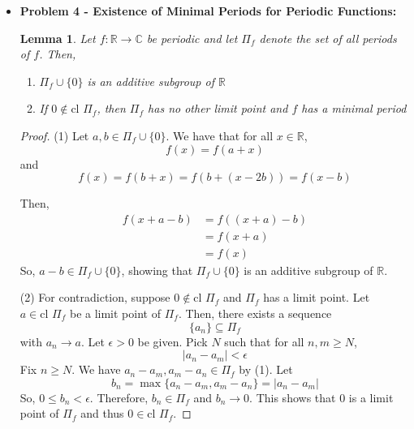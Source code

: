 \documentclass[12pt, reqno]{amsart}
\newtheorem{lemma}[theorem]{Lemma}
\theoremstyle{definition}
\theoremstyle{remark}
\begin{document}
\begin{itemize}
\begin{itemize}
\begin{proof}
We have \begin{align*}
I_{n}&\ge \frac{2}{\pi^{2}}\log n\\
I_{n}&\le \frac{1}{2}+ \frac{1}{2}(\ln 2n)\\
2I_{n}&\le 1+\ln (2n)\\
&= 1+\ln 2+\ln n\\
&\le 3+\ln n\\
2I_{n}&\ge \frac{4}{\pi^{2}}\log n
\end{align*}
showing the desired bounds.
\end{proof}

\end{itemize}

\vspace{0.2 cm}
\item {\bf{Problem 4 - Existence of Minimal Periods for Periodic Functions:}} 


\begin{lemma}
   Let $f:\mathbb{R}\rightarrow \mathbb{C}$ be periodic and let $\Pi_f$ denote the set of all periods of $f$. Then, 
   \begin{enumerate}
   \item $\Pi_f\cup\{0\}$ is an additive subgroup of $\mathbb{R}$
   \item If $0\notin \text{cl }\Pi_f$, then $\Pi_f$ has no other limit point and $f$ has a minimal period
\end{enumerate}
\end{lemma}

\begin{proof}
   
   (1) Let $a,b\in \Pi_{f}\cup\{0\}$. We have that for all $x\in \mathbb{R}$, $$f(x)=f(a+x)$$and $$f(x)=f(b+x)=f(b+(x-2b))=f(x-b)$$

Then, \begin{align*}
f(x+a-b)&= f((x+a)-b)\\
&= f(x+a)\\
&= f(x)
\end{align*}
So, $a-b\in \Pi_f\cup\{0\}$, showing that $\Pi_f\cup\{0\}$ is an additive subgroup of $\mathbb{R}$. 

(2) For contradiction, suppose $0\notin \text{cl }\Pi_{f}$ and $\Pi_f$ has a limit point. Let $a\in \text{cl }\Pi_{f}$ be a limit point of $\Pi_{f}$. Then, there exists a sequence $$\{a_{n}\}\subseteq \Pi_f$$with $a_{n}\rightarrow a$. Let $\epsilon>0$ be given. Pick $N$ such that for all $n,m\ge N$, $$|a_{n}-a_{m}|<\epsilon$$Fix $n\ge N$. We have $a_{n}-a_{m},a_{m}-a_{n}\in \Pi_{f}$ by (1). Let $$b_{n}=\max\{a_{n}-a_{m},a_{m}-a_{n}\}=|a_{n}-a_{m}|$$So, $0\le b_{n}<\epsilon$. Therefore, $b_{n}\in \Pi_{f}$ and $b_{n}\rightarrow 0$. This shows that $0$ is a limit point of $\Pi_{f}$ and thus $0\in \text{cl }\Pi_{f}$.


\end{proof}
\end{itemize}
\end{document}
